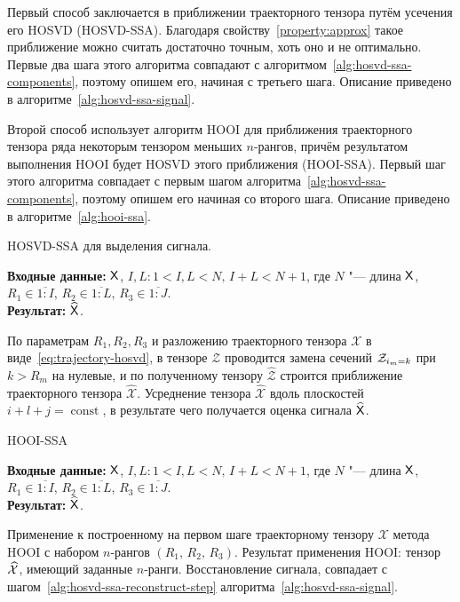\documentclass[specialist,
  substylefile=spbu_report.rtx,
subf,href,colorlinks=true, 12pt]{disser}
\theoremstyle{plain}
\theoremstyle{definition}
\theoremstyle{remark}
\newcommand{\Input}{\textbf{Входные данные: }}
\newcommand{\Output}{\textbf{Результат: }}
\begin{document}
Первый способ заключается в приближении траекторного тензора путём усечения его HOSVD (HOSVD-SSA).
Благодаря свойству~\ref{property:approx} такое приближение можно считать достаточно точным,
хоть оно и не оптимально.
Первые два шага этого алгоритма совпадают с алгоритмом~\ref{alg:hosvd-ssa-components}, поэтому опишем его, начиная с третьего шага.
Описание приведено в алгоритме~\ref{alg:hosvd-ssa-signal}.

Второй способ использует алгоритм HOOI для приближения траекторного тензора ряда некоторым тензором
меньших $n$-рангов, причём результатом выполнения HOOI будет HOSVD этого приближения (HOOI-SSA).
Первый шаг этого алгоритма совпадает с первым шагом алгоритма~\ref{alg:hosvd-ssa-components},
поэтому опишем его начиная со второго шага.
Описание приведено в алгоритме~\ref{alg:hooi-ssa}.

\begin{algorithm}[!ht]
  \caption{HOSVD-SSA для выделения сигнала.}
  \label{alg:hosvd-ssa-signal}
  \Input $\mathsf{X}$, $I,L: 1< I,L < N,\, I + L < N + 1$, где $N$ "--- длина $\mathsf{X}$, $R_1 \in \overline{1:I}$,
  $R_2 \in \overline{1:L}$, $R_3 \in \overline{1:J}$.\\
  \Output $\widehat{\mathsf{X}}$.

  \begin{algorithmic}[1]
    \State По параметрам $R_1, R_2, R_3$ и разложению траекторного тензора $\mathcal{X}$
    в виде~\eqref{eq:trajectory-hosvd},
    в тензоре $\mathcal{Z}$ проводится замена сечений $\mathcal{Z}_{i_m = k}$ при $k>R_m$ на нулевые,
    и по полученному тензору $\widehat{\mathcal{Z}}$
    строится приближение траекторного тензора $\widehat{\mathcal{X}}$.
    \State \label{alg:hosvd-ssa-reconstruct-step}
    Усреднение тензора $\widehat{\mathcal{X}}$ вдоль плоскостей $i+l+j=\operatorname{const}$,
    в результате чего получается оценка сигнала $\widehat{\mathsf{X}}$.
  \end{algorithmic}
\end{algorithm}

\begin{algorithm}[!ht]
  \caption{HOOI-SSA}
  \label{alg:hooi-ssa}
  \Input $\mathsf{X}$, $I,L: 1< I,L <N,\, I + L < N + 1$, где $N$ "--- длина $\mathsf{X}$, $R_1 \in \overline{1:I}$,
  $R_2 \in \overline{1:L}$, $R_3 \in \overline{1:J}$.\\
  \Output $\widehat{\mathsf{X}}$.

  \begin{algorithmic}[1]
    \State Применение к построенному на первом шаге траекторному тензору $\mathcal{X}$ метода
    HOOI с набором $n$-рангов $(R_1,\, R_2,\, R_3)$. Результат применения HOOI: тензор $\widehat{\mathcal{X}}$,
    имеющий заданные $n$-ранги.
    \State Восстановление сигнала, совпадает с шагом~\ref{alg:hosvd-ssa-reconstruct-step}
    алгоритма~\ref{alg:hosvd-ssa-signal}.
  \end{algorithmic}
\end{algorithm}
\end{document}
